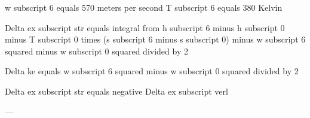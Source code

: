 w subscript 6 equals 570 meters per second  
T subscript 6 equals 380 Kelvin  

Delta ex subscript str equals integral from h subscript 6 minus h subscript 0 minus T subscript 0 times (s subscript 6 minus s subscript 0) minus w subscript 6 squared minus w subscript 0 squared divided by 2  

Delta ke equals w subscript 6 squared minus w subscript 0 squared divided by 2  

Delta ex subscript str equals negative Delta ex subscript verl  

---